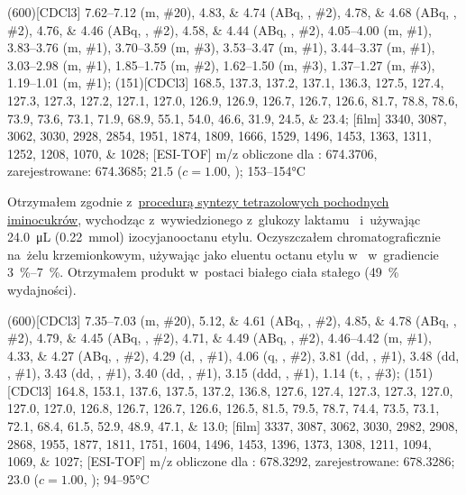 \begin{fullexp}
	\NMR(600)[CDCl3] \numrange{7.62}{7.12} (m, \#{20}), \numlist{4.83;4.74} (ABq, , \#{2}), \numlist{4.78;4.68} (ABq, , \#{2}), \numlist{4.76;4.46} (ABq, , \#{2}), \numlist{4.58;4.44} (ABq, , \#{2}), \numrange{4.05}{4.00} (m, \#{1}), \numrange{3.83}{3.76} (m, \#{1}), \numrange{3.70}{3.59} (m, \#{3}), \numrange{3.53}{3.47} (m, \#{1}), \numrange{3.44}{3.37} (m, \#{1}), \numrange{3.03}{2.98} (m, \#{1}), \numrange{1.85}{1.75} (m, \#{2}), \numrange{1.62}{1.50} (m, \#{3}), \numrange{1.37}{1.27} (m, \#{3}), \numrange{1.19}{1.01} (m, \#{1});
	(151)[CDCl3] \numlist{168.5; 137.3; 137.2; 137.1; 136.3; 127.5; 127.4; 127.3; 127.3; 127.2; 127.1; 127.0; 126.9; 126.9; 126.7; 126.7; 126.6; 81.7; 78.8; 78.6; 73.9; 73.6; 73.1; 71.9; 68.9; 55.1; 54.0; 46.6; 31.9; 24.5; 23.4};
	[film] \numlist{3340; 3087; 3062; 3030; 2928; 2854; 1951; 1874; 1809; 1666; 1529; 1496; 1453; 1363; 1311; 1252; 1208; 1070; 1028};
	[ESI-TOF] m/z obliczone dla : \num{674.3706}, zarejestrowane: \num{674.3685};
	\data{[$\alpha^{23}_D$]~$=$} \num{21.5} ($c = 1.00$, );
	 \numrange{153}{154}\si{\celsius}
\end{fullexp}

Otrzymałem zgodnie z~\hyperref[experimental:sugars:schwartz]{procedurą syntezy tetrazolowych
	pochodnych iminocukrów}, wychodząc z~wywiedzionego z~glukozy laktamu~
	i~używając \SI{24.0}{\micro\liter} (\SI{0.22}{\milli\mol}) izocyjanooctanu etylu.
Oczyszczałem chromatograficznie na~żelu krzemionkowym,
	używając jako eluentu octanu etylu w~ w~gradiencie \SIrange{3}{7}{\percent}.
Otrzymałem produkt w~postaci białego ciała stałego (\SI{49}{\percent} wydajności).

\begin{fullexp}
	\NMR(600)[CDCl3] \numrange{7.35}{7.03} (m, \#{20}), \numlist{5.12;4.61} (ABq, , \#{2}), \numlist{4.85;4.78} (ABq, , \#{2}), \numlist{4.79;4.45} (ABq, , \#{2}), \numlist{4.71;4.49} (ABq, , \#{2}), \numrange{4.46}{4.42} (m, \#{1}), \numlist{4.33;4.27} (ABq, , \#{2}), \num{4.29} (d, , \#{1}), \num{4.06} (q, , \#{2}), \num{3.81} (dd, , \#{1}), \num{3.48} (dd, , \#{1}), \num{3.43} (dd, , \#{1}), \num{3.40} (dd, , \#{1}), \num{3.15} (ddd, , \#{1}), \num{1.14} (t, , \#{3});
	(151)[CDCl3] \numlist{164.8; 153.1; 137.6; 137.5; 137.2; 136.8; 127.6; 127.4; 127.3; 127.3; 127.0; 127.0; 127.0; 126.8; 126.7; 126.7; 126.6; 126.5; 81.5; 79.5; 78.7; 74.4; 73.5; 73.1; 72.1; 68.4; 61.5; 52.9; 48.9; 47.1; 13.0};
	[film] \numlist{3337; 3087; 3062; 3030; 2982; 2908; 2868; 1955; 1877; 1811; 1751; 1604; 1496; 1453; 1396; 1373; 1308; 1211; 1094; 1069; 1027};
	[ESI-TOF] m/z obliczone dla : \num{678.3292}, zarejestrowane: \num{678.3286};
	\data{[$\alpha^{23}_D$]~$=$} \num{23.0} ($c = 1.00$, );
	 \numrange{94}{95}\si{\celsius}
\end{fullexp}

